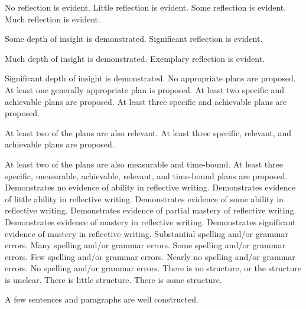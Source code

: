 \documentclass{../fal_assignment}
\begin{document}
\begin{markingrubric}
%
        \grade\fail 	No reflection is evident.
        \grade 		Little reflection is evident.
        \grade 		Some reflection is evident.
        \grade 		Much reflection is evident.
        \par 		Some depth of insight is demonstrated.
        \grade 		Significant reflection is evident.
        \par 		Much depth of insight is demonstrated.
        \grade 		Exemplary reflection is evident.
        \par 		Significant depth of insight is demonstrated.
%
        \grade\fail 	No appropriate plans are proposed.
        \grade 		At least one generally appropriate plan is proposed.
        \grade 		At least two specific and achievable plans are proposed. 
        \grade 		At least three specific and achievable plans are proposed. 
        \par 		At least two of the plans are also relevant.
        \grade 		At least three specific, relevant, and achievable plans are proposed. 
        \par 		At least two of the plans are also measurable and time-bound.
        \grade 		At least three specific, measurable, achievable, relevant, and time-bound plans are proposed. 
%
        \grade\fail 	Demonstrates no evidence of ability in reflective writing.
        \grade 		Demonstrates evidence of little ability in reflective writing.
        \grade 		Demonstrates evidence of some ability in reflective writing.  
        \grade 		Demonstrates evidence of partial mastery of reflective writing.
        \grade 		Demonstrates evidence of mastery in reflective writing.
        \grade 		Demonstrates significant evidence of mastery in reflective writing.
%
        \grade\fail 	Substantial spelling and/or grammar errors.
        \grade 		Many spelling and/or grammar errors.
        \grade 		Some spelling and/or grammar errors.  
        \grade 		Few spelling and/or grammar errors.
        \grade 		Nearly no spelling and/or grammar errors.
        \grade 		No spelling and/or grammar errors.
%
        \grade\fail 	There is no structure, or the structure is unclear.
        \grade 		There is little structure.
        \grade 		There is some structure.
        \par 		A few sentences and paragraphs are well constructed.

\end{markingrubric}
\end{document}
